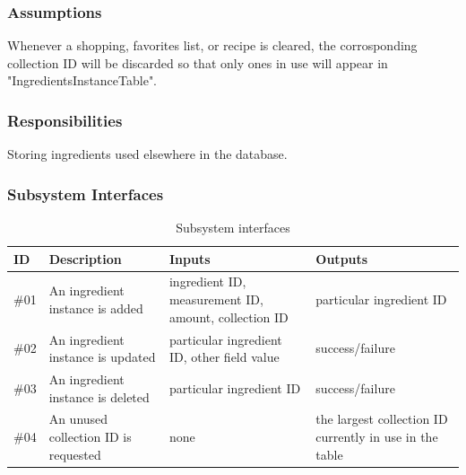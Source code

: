 
\subsubsection{Assumptions}
Whenever a shopping, favorites list, or recipe is cleared, the corrosponding collection ID will be discarded so that only ones in use will appear in "IngredientsInstanceTable".

\subsubsection{Responsibilities}
Storing ingredients used elsewhere in the database.


\subsubsection{Subsystem Interfaces}
\begin {table}[H]
\caption {Subsystem interfaces} 
\begin{center}
    \begin{tabular}{ | p{1cm} | p{6cm} | p{3cm} | p{3cm} |}
    \hline
    ID & Description & Inputs & Outputs \\ \hline
    \#01 & An ingredient instance is added & ingredient ID, measurement ID, amount, collection ID & particular ingredient ID  \\ \hline
    \#02 & An ingredient instance is updated & particular ingredient ID, other field value & success/failure  \\ \hline
    \#03 & An ingredient instance is deleted & particular ingredient ID & success/failure  \\ \hline
    \#04 & An unused collection ID is requested & none & the largest collection ID currently in use in the table  \\ \hline
    \end{tabular}
\end{center}
\end{table}


